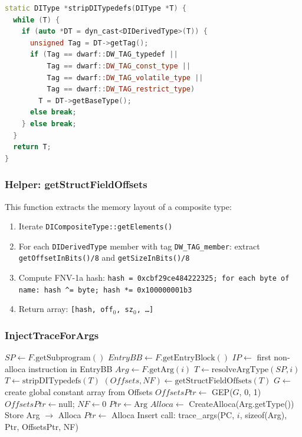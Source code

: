 \documentclass{ndss}
\begin{document}
\begin{lstlisting}[language=C++,caption={Recursive typedef/qualifier stripping.}]
static DIType *stripDITypedefs(DIType *T) {
  while (T) {
    if (auto *DT = dyn_cast<DIDerivedType>(T)) {
      unsigned Tag = DT->getTag();
      if (Tag == dwarf::DW_TAG_typedef ||
          Tag == dwarf::DW_TAG_const_type ||
          Tag == dwarf::DW_TAG_volatile_type ||
          Tag == dwarf::DW_TAG_restrict_type)
        T = DT->getBaseType();
      else break;
    } else break;
  }
  return T;
}
\end{lstlisting}

\subsubsection{Helper: getStructFieldOffsets}

This function extracts the memory layout of a composite type:
\begin{enumerate}[nosep]
  \item Iterate \texttt{DICompositeType::getElements()}
  \item For each \texttt{DIDerivedType} member with tag
        \texttt{DW\_TAG\_member}: extract \texttt{getOffsetInBits()/8} and
        \texttt{getSizeInBits()/8}
  \item Compute FNV-1a hash: \texttt{hash = 0xcbf29ce484222325; for each byte
        of name: hash \^{}= byte; hash *= 0x100000001b3}
  \item Return array: \texttt{[hash, off$_0$, sz$_0$, \ldots]}
\end{enumerate}

\subsubsection{InjectTraceForArgs}

\begin{algorithmic}[1]
  \State $\mathit{SP} \gets F.\mathrm{getSubprogram()}$
   \Return \EndIf
  \State $\mathit{EntryBB} \gets F.\mathrm{getEntryBlock()}$
  \State $\mathit{IP} \gets$ first non-alloca instruction in EntryBB
    \State $\mathit{Arg} \gets F.\mathrm{getArg}(i)$
    \State $T \gets \mathrm{resolveArgType}(\mathit{SP}, i)$
    \State $T \gets \mathrm{stripDITypedefs}(T)$
      \State $(\mathit{Offsets}, \mathit{NF}) \gets \mathrm{getStructFieldOffsets}(T)$
      \State $G \gets$ create global constant array from Offsets
      \State $\mathit{OffsetsPtr} \gets$ GEP($G$, 0, 1) 
    \Else
      \State $\mathit{OffsetsPtr} \gets \mathrm{null}$; $\mathit{NF} \gets 0$
    \EndIf
      \State $\mathit{Ptr} \gets \mathrm{Arg}$
    \Else
      \State $\mathit{Alloca} \gets$ CreateAlloca(Arg.getType())
      \State Store Arg $\to$ Alloca
      \State $\mathit{Ptr} \gets$ Alloca
    \EndIf
    \State Insert call: trace\_args(PC, $i$, sizeof(Arg), Ptr, OffsetsPtr, NF)
  \EndFor
\EndFunction
\end{algorithmic}
\end{document}
